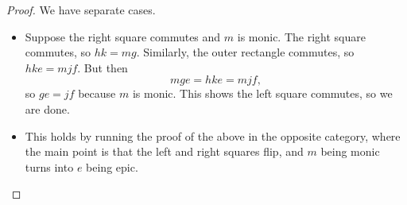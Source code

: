 \begin{proof}
	We have separate cases.
	\begin{itemize}
		\item Suppose the right square commutes and $m$ is monic. The right square commutes, so $hk=mg$. Similarly, the outer rectangle commutes, so $hke=mjf$. But then
		\[mge=hke=mjf,\]
		so $ge=jf$ because $m$ is monic. This shows the left square commutes, so we are done.
		\item This holds by running the proof of the above in the opposite category, where the main point is that the left and right squares flip, and $m$ being monic turns into $e$ being epic.
		\qedhere
	\end{itemize}
\end{proof}